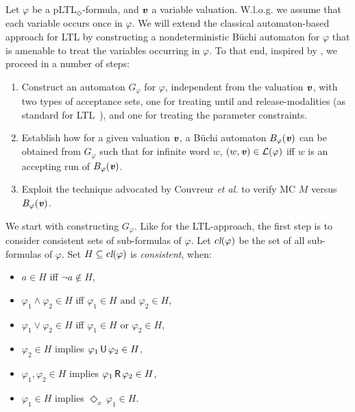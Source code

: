 \documentclass{llncs}
\newcommand{\cl}{\mbox{\sl cl}}
\newcommand{\Until}{\mbox{$\, {\sf U}\,$}}
\newcommand{\U}{\Until}
\newcommand{\Release}{\mbox{$\, {\sf R}\,$}}
\renewcommand{\L}{{\cal L}}
\renewcommand{\a}[1]{\textbf{\textit{#1}}}
\newcommand{\ve}{{{\a v}}}
\newcommand{\de}{\Diamond}
\begin{document}
Let $\varphi$ be a pLTL$_\de$-formula, and ${\a v}$ a variable valuation.
W.l.o.g. we assume that each variable occurs once in $\varphi$.
We will extend the classical automaton-based approach for LTL by constructing a nondeterministic B\"uchi automaton for $\varphi$ that is amenable to treat the variables occurring in $\varphi$.
To that end, inspired by \cite{DBLP:journals/tcs/Zimmermann13}, we proceed in a number of steps:
\begin{enumerate}
\item 
Construct an automaton $G_\varphi$ for $\varphi$, independent from the valuation ${\a v}$, with two types of acceptance sets, one for treating until and release-modalities (as standard for 
LTL~\cite{Vardi96anautomata-theoretic}), and one for treating the parameter constraints.
\item 
Establish how for a given valuation ${\a v}$, a B\"uchi automaton $B_\varphi({\a v})$ can be obtained from $G_\varphi$ such that for infinite word $w$, $(w, {\a v}) \in \L(\varphi)$ iff $w$ is an accepting run of $B_\varphi({\a v})$.
\item 
Exploit the technique advocated by Couvreur \emph{et al.} \cite{CouvreurSahebSutre03} to verify MC $M$ versus $B_\varphi(\ve)$.
\end{enumerate}
We start with constructing $G_\varphi$.
Like for the LTL-approach, the first step is to consider consistent sets of sub-formulas of $\varphi$.
Let $\cl(\varphi)$ be the set of all sub-formulas of $\varphi$. 
Set $H \subseteq \cl(\varphi)$ is \emph{consistent}, when: \\[1ex] \begin{minipage}{0.5\textwidth}
\begin{itemize}
    \item $a\in H$ iff $\neg a \not\in H$,
    \item $\varphi_1 \wedge \varphi_2\in H$ iff $\varphi_1 \in H \mbox{ and } \varphi_2\in H$,
    \item $\varphi_1 \vee \varphi_2 \in H$ iff $\varphi_1\in H \mbox{ or } \varphi_2\in H$,
\end{itemize}
\end{minipage}
\begin{minipage}{0.5\textwidth}
\begin{itemize}
    \item $\varphi_2 \in H$ implies $\varphi_1 \U\varphi_2 \in H$,
    \item $\varphi_1,\varphi_2 \in H$ implies $\varphi_1 \Release \varphi_2 \in H$,
    \item $\varphi_1 \in H$ implies $\de_{x} \, \varphi_1 \in H$.
\end{itemize}
\end{minipage} \\[1ex]
\end{document}
